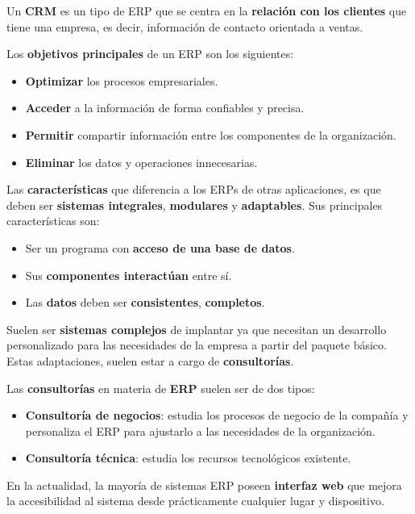 Un \textbf{CRM} es un tipo de ERP que se centra en la \textbf{relación con los clientes} que tiene una empresa, es decir, información de contacto orientada a ventas.

Los \textbf{objetivos principales} de un ERP son los siguientes:

\begin{itemize}
    \item \textbf{Optimizar} los procesos empresariales.
    \item \textbf{Acceder} a la información de forma confiables y precisa.
    \item \textbf{Permitir} compartir información entre los componentes de la organización.
    \item \textbf{Eliminar} los datos y operaciones innecesarias.
\end{itemize}

Las \textbf{características} que diferencia a los ERPs de otras aplicaciones, es que deben ser \textbf{sistemas integrales}, \textbf{modulares} y \textbf{adaptables}. Sus principales características son:

\begin{itemize}
    \item Ser un programa con \textbf{acceso de una base de datos}.
    \item Sus \textbf{componentes interactúan} entre sí.
    \item Las \textbf{datos} deben ser \textbf{consistentes}, \textbf{completos}.
\end{itemize}

Suelen ser \textbf{sistemas complejos} de implantar ya que necesitan un desarrollo personalizado para las necesidades de la empresa a partir del paquete básico. Estas adaptaciones, suelen estar a cargo de \textbf{consultorías}.

Las \textbf{consultorías} en materia de \textbf{ERP} suelen ser de dos tipos:

\begin{itemize}
    \item \textbf{Consultoría de negocios}: estudia los procesos de negocio de la compañía y personaliza el ERP para ajustarlo a las necesidades de la organización.
    \item \textbf{Consultoría técnica}: estudia los recursos tecnológicos existente.
\end{itemize}

En la actualidad, la mayoría de sistemas ERP poseen \textbf{interfaz web} que mejora la accesibilidad al sistema desde prácticamente cualquier lugar y dispositivo.

